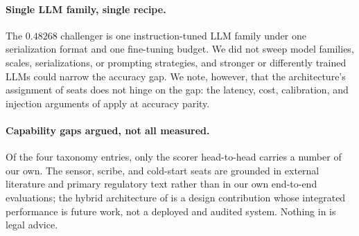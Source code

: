 \paragraph{Single LLM family, single recipe.} The $0.48268$ challenger is one
instruction-tuned LLM family under one serialization format and one
fine-tuning budget. We did not sweep model
families, scales, serializations, or prompting strategies, and stronger or
differently trained LLMs could narrow the accuracy gap. We note, however, that
the architecture's assignment of seats does not hinge on the gap: the
latency, cost, calibration, and injection arguments of 
apply at accuracy parity.

\paragraph{Capability gaps argued, not all measured.} Of the four taxonomy
entries, only the scorer head-to-head carries a number of our own. The sensor,
scribe, and cold-start seats are grounded in external literature and primary
regulatory text rather than in our own end-to-end evaluations; the hybrid
architecture of  is a design contribution whose
integrated performance is future work, not a deployed and audited system.
Nothing in  is legal advice.
